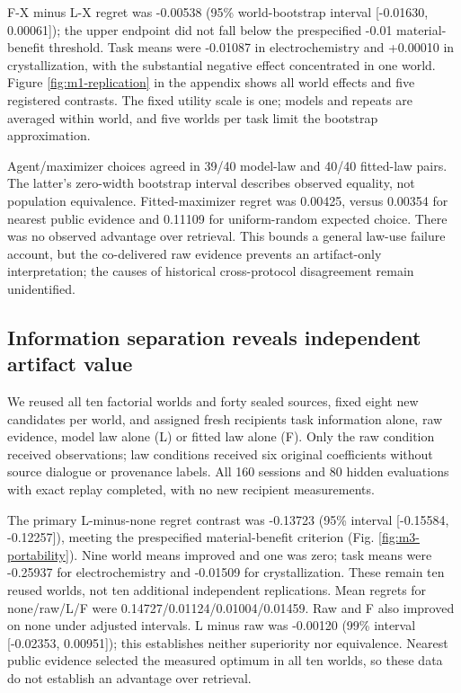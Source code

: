 \documentclass{article}
\begin{document}
F-X minus L-X regret was -0.00538 (95\% world-bootstrap interval
{[}-0.01630, 0.00061{]}); the upper endpoint did not fall below the
prespecified -0.01 material-benefit threshold. Task means were -0.01087
in electrochemistry and +0.00010 in crystallization, with the
substantial negative effect concentrated in one world. Figure
\ref{fig:m1-replication} in the appendix shows all world effects and
five registered contrasts. The fixed utility scale is one; models and
repeats are averaged within world, and five worlds per task limit the
bootstrap approximation.

Agent/maximizer choices agreed in 39/40 model-law and 40/40 fitted-law
pairs. The latter's zero-width bootstrap interval describes observed
equality, not population equivalence. Fitted-maximizer regret was
0.00425, versus 0.00354 for nearest public evidence and 0.11109 for
uniform-random expected choice. There was no observed advantage over
retrieval. This bounds a general law-use failure account, but the
co-delivered raw evidence prevents an artifact-only interpretation; the
causes of historical cross-protocol disagreement remain unidentified.

\subsection{Information separation reveals independent artifact
value}\label{information-separation-reveals-independent-artifact-value}

We reused all ten factorial worlds and forty sealed sources, fixed eight
new candidates per world, and assigned fresh recipients task information
alone, raw evidence, model law alone (L) or fitted law alone (F). Only
the raw condition received observations; law conditions received six
original coefficients without source dialogue or provenance labels. All
160 sessions and 80 hidden evaluations with exact replay completed, with
no new recipient measurements.

The primary L-minus-none regret contrast was -0.13723 (95\% interval
{[}-0.15584, -0.12257{]}), meeting the prespecified material-benefit
criterion (Fig. \ref{fig:m3-portability}). Nine world means improved and
one was zero; task means were -0.25937 for electrochemistry and -0.01509
for crystallization. These remain ten reused worlds, not ten additional
independent replications. Mean regrets for none/raw/L/F were
0.14727/0.01124/0.01004/0.01459. Raw and F also improved on none under
adjusted intervals. L minus raw was -0.00120 (99\% interval {[}-0.02353,
0.00951{]}); this establishes neither superiority nor equivalence.
Nearest public evidence selected the measured optimum in all ten worlds,
so these data do not establish an advantage over retrieval.
\end{document}
